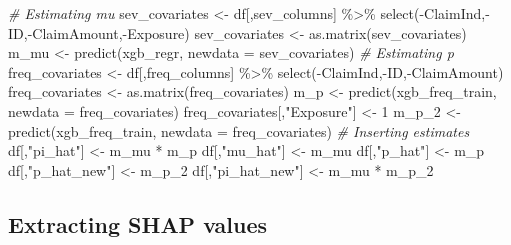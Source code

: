 \documentclass[
]{article}
\newenvironment{Shaded}{\begin{snugshade}}{\end{snugshade}}
\newcommand{\AttributeTok}[1]{\textcolor[rgb]{0.77,0.63,0.00}{#1}}
\newcommand{\CommentTok}[1]{\textcolor[rgb]{0.56,0.35,0.01}{\textit{#1}}}
\newcommand{\DecValTok}[1]{\textcolor[rgb]{0.00,0.00,0.81}{#1}}
\newcommand{\FunctionTok}[1]{\textcolor[rgb]{0.00,0.00,0.00}{#1}}
\newcommand{\NormalTok}[1]{#1}
\newcommand{\OtherTok}[1]{\textcolor[rgb]{0.56,0.35,0.01}{#1}}
\newcommand{\SpecialCharTok}[1]{\textcolor[rgb]{0.00,0.00,0.00}{#1}}
\newcommand{\StringTok}[1]{\textcolor[rgb]{0.31,0.60,0.02}{#1}}
\begin{document}
\begin{Shaded}
\begin{Highlighting}[]
\CommentTok{\# Estimating mu}
\NormalTok{sev\_covariates }\OtherTok{\textless{}{-}}\NormalTok{ df[,sev\_columns] }\SpecialCharTok{\%\textgreater{}\%}
  \FunctionTok{select}\NormalTok{(}\SpecialCharTok{{-}}\NormalTok{ClaimInd,}\SpecialCharTok{{-}}\NormalTok{ID,}\SpecialCharTok{{-}}\NormalTok{ClaimAmount,}\SpecialCharTok{{-}}\NormalTok{Exposure)}
\NormalTok{sev\_covariates }\OtherTok{\textless{}{-}}  \FunctionTok{as.matrix}\NormalTok{(sev\_covariates)}
\NormalTok{m\_mu }\OtherTok{\textless{}{-}} \FunctionTok{predict}\NormalTok{(xgb\_regr, }\AttributeTok{newdata =}\NormalTok{ sev\_covariates)}
\CommentTok{\# Estimating p}
\NormalTok{freq\_covariates }\OtherTok{\textless{}{-}}\NormalTok{ df[,freq\_columns] }\SpecialCharTok{\%\textgreater{}\%}
  \FunctionTok{select}\NormalTok{(}\SpecialCharTok{{-}}\NormalTok{ClaimInd,}\SpecialCharTok{{-}}\NormalTok{ID,}\SpecialCharTok{{-}}\NormalTok{ClaimAmount)}
\NormalTok{freq\_covariates }\OtherTok{\textless{}{-}} \FunctionTok{as.matrix}\NormalTok{(freq\_covariates)}
\NormalTok{m\_p }\OtherTok{\textless{}{-}} \FunctionTok{predict}\NormalTok{(xgb\_freq\_train, }\AttributeTok{newdata =}\NormalTok{ freq\_covariates)}
\NormalTok{freq\_covariates[,}\StringTok{"Exposure"}\NormalTok{] }\OtherTok{\textless{}{-}} \DecValTok{1}
\NormalTok{m\_p\_2 }\OtherTok{\textless{}{-}} \FunctionTok{predict}\NormalTok{(xgb\_freq\_train, }\AttributeTok{newdata =}\NormalTok{ freq\_covariates)}
\CommentTok{\# Inserting estimates}
\NormalTok{df[,}\StringTok{"pi\_hat"}\NormalTok{] }\OtherTok{\textless{}{-}}\NormalTok{ m\_mu }\SpecialCharTok{*}\NormalTok{ m\_p}
\NormalTok{df[,}\StringTok{"mu\_hat"}\NormalTok{] }\OtherTok{\textless{}{-}}\NormalTok{ m\_mu}
\NormalTok{df[,}\StringTok{"p\_hat"}\NormalTok{] }\OtherTok{\textless{}{-}}\NormalTok{ m\_p}
\NormalTok{df[,}\StringTok{"p\_hat\_new"}\NormalTok{] }\OtherTok{\textless{}{-}}\NormalTok{ m\_p\_2}
\NormalTok{df[,}\StringTok{"pi\_hat\_new"}\NormalTok{] }\OtherTok{\textless{}{-}}\NormalTok{ m\_mu }\SpecialCharTok{*}\NormalTok{ m\_p\_2}
\end{Highlighting}
\end{Shaded}

\hypertarget{extracting-shap-values}{%
\subsection{Extracting SHAP values}\label{extracting-shap-values}}
\end{document}
